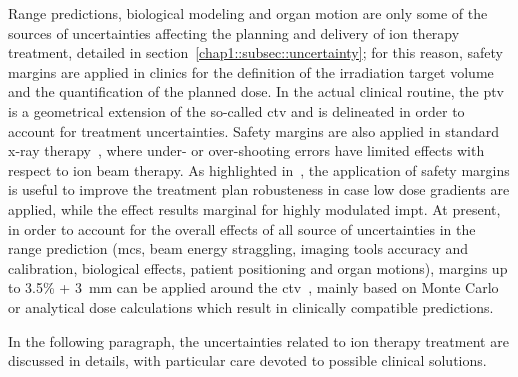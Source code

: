 Range predictions, biological modeling and organ motion are only some of the sources of uncertainties affecting the planning and delivery of ion therapy treatment, detailed in section~\ref{chap1::subsec::uncertainty}; for this reason, safety margins  are applied in clinics for the definition of the irradiation target volume and the quantification of the planned dose. In the actual clinical routine, the \gls{ptv} is a geometrical extension of the so-called \gls{ctv} and is delineated in order to account for treatment uncertainties. Safety margins are also applied in standard x-ray therapy~\parencite{McKenzie2000}, where under- or over-shooting errors have limited effects with respect to ion beam therapy. As highlighted in~\cite{Albertini2011}, the application of safety margins is useful to improve the treatment plan robusteness in case low dose gradients are applied, while the effect results marginal for highly modulated \gls{impt}. At present, in order to account for the overall effects of all source of uncertainties in the range prediction (\gls{mcs}, beam energy straggling, imaging tools accuracy and calibration, biological effects, patient positioning and organ motions), margins up to 3.5\% + 3~mm can be applied around the \gls{ctv}~\parencite{Paganetti2012}, mainly based on Monte Carlo or analytical dose calculations which result in clinically compatible predictions. 

In the following paragraph, the uncertainties related to ion therapy treatment are discussed in details, with particular care devoted to possible clinical solutions.

